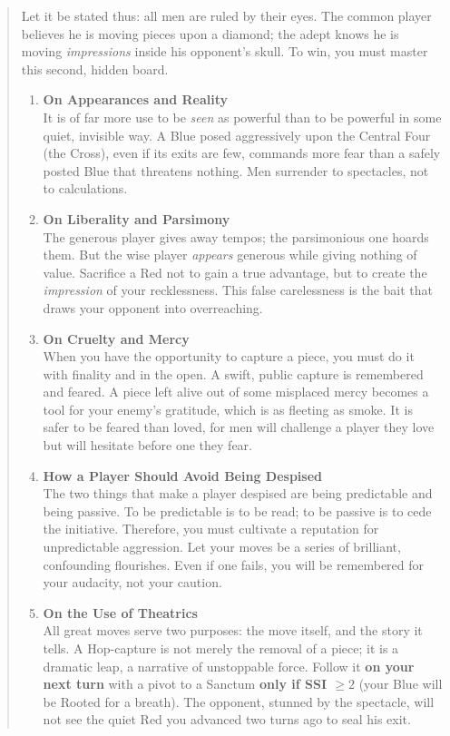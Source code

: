 \documentclass[11pt]{article}
\begin{document}
\begin{quote}\small
Let it be stated thus: all men are ruled by their eyes. The common player believes he is moving pieces upon a diamond; the adept knows he is moving \emph{impressions} inside his opponent’s skull. To win, you must master this second, hidden board.

\medskip
\begin{enumerate}[leftmargin=*,label=\textbf{\Roman*.}]
\item \textbf{On Appearances and Reality}\\
It is of far more use to be \emph{seen} as powerful than to be powerful in some quiet, invisible way. A Blue posed aggressively upon the Central Four (the Cross), even if its exits are few, commands more fear than a safely posted Blue that threatens nothing. Men surrender to spectacles, not to calculations.

\item \textbf{On Liberality and Parsimony}\\
The generous player gives away tempos; the parsimonious one hoards them. But the wise player \emph{appears} generous while giving nothing of value. Sacrifice a Red not to gain a true advantage, but to create the \emph{impression} of your recklessness. This false carelessness is the bait that draws your opponent into overreaching.

\item \textbf{On Cruelty and Mercy}\\
When you have the opportunity to capture a piece, you must do it with finality and in the open. A swift, public capture is remembered and feared. A piece left alive out of some misplaced mercy becomes a tool for your enemy’s gratitude, which is as fleeting as smoke. It is safer to be feared than loved, for men will challenge a player they love but will hesitate before one they fear.

\item \textbf{How a Player Should Avoid Being Despised}\\
The two things that make a player despised are being predictable and being passive. To be predictable is to be read; to be passive is to cede the initiative. Therefore, you must cultivate a reputation for unpredictable aggression. Let your moves be a series of brilliant, confounding flourishes. Even if one fails, you will be remembered for your audacity, not your caution.

\item \textbf{On the Use of Theatrics}\\
All great moves serve two purposes: the move itself, and the story it tells. A Hop-capture is not merely the removal of a piece; it is a dramatic leap, a narrative of unstoppable force. Follow it \textbf{on your next turn} with a pivot to a Sanctum \textbf{only if SSI $\ge 2$} (your Blue will be Rooted for a breath). The opponent, stunned by the spectacle, will not see the quiet Red you advanced two turns ago to seal his exit.


\end{enumerate}
\end{quote}
\end{document}
